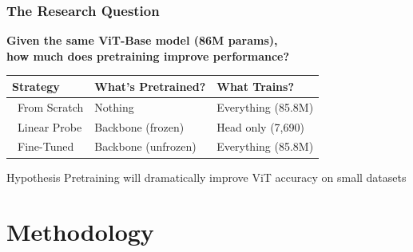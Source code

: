 \documentclass[aspectratio=169]{beamer}
\newcommand{\cmark}{\ding{51}}  %
\newcommand{\xmark}{\ding{55}}  %
\begin{document}
\begin{frame}
    \frametitle{The Research Question}

    \begin{center}
        \Large
        \textbf{Given the same ViT-Base model (86M params),}\\[0.3cm]
        \textbf{how much does pretraining improve performance?}
    \end{center}

    \vspace{0.2cm}

    \begin{table}
        \centering
        \begin{tabular}{lll}
            \toprule
            \textbf{Strategy} & \textbf{What's Pretrained?} & \textbf{What Trains?} \\
            \midrule
            \xmark\ From Scratch & Nothing & Everything (85.8M) \\
            \cmark\ Linear Probe & Backbone (frozen) & Head only (7,690) \\
            \cmark\ Fine-Tuned & Backbone (unfrozen) & Everything (85.8M) \\
            \bottomrule
        \end{tabular}
    \end{table}

    \vspace{0.15cm}

    \begin{block}{Hypothesis}
        Pretraining will dramatically improve ViT accuracy on small datasets
    \end{block}
\end{frame}

\section{Methodology}
\end{document}
